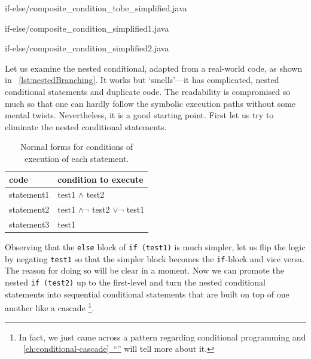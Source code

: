 \documentclass[oneside,11pt]{book}
\theoremstyle{definition}
\theoremstyle{remark}
\newcommand{\code}[1]{\mbox{\lstinline{#1}}}
\newcommand*{\fullref}[1]{\hyperref[{#1}]{\mbox{\autoref*{#1}~}``\nameref*{#1}''}}
\begin{document}
\begin{clisting}
    \begin{minipage}[t]{.3\textwidth}
        
        {if-else/composite_condition_tobe_simplified.java}
    \end{minipage}\hfill
    \begin{minipage}[t]{.3\textwidth}
        
        {if-else/composite_condition_simplified1.java}
    \end{minipage}\hfill
    \begin{minipage}[t]{.3\textwidth}
        
        {if-else/composite_condition_simplified2.java}
    \end{minipage}
\end{clisting}
Let us examine the nested conditional, adapted from a real-world code, as shown in
~\autoref{lst:nestedBranching}.
It works but `smells'---it has complicated, nested conditional statements and duplicate
code\cite{Fowler1999}.
The readability is compromised so much so that one can hardly follow the symbolic execution paths
without some mental twists.
Nevertheless, it is a good starting point.
First let us try to eliminate the nested conditional statements.


\begin{table}[bth]
    \begin{center}
        \caption{Normal forms for conditions of execution of each statement.
        \label{tbl:breakdown-of-conditions}}
        \begin{tabular}{|l|l|}
            \hline
            code & condition to execute \\
            \hline
            statement1 & test1 $\land$ test2 \\
            statement2 & test1 $\land\lnot$ test2 $\lor\lnot$ test1 \\
            statement3 & test1 \\
            \hline
        \end{tabular}
    \end{center}
\end{table}
Observing that the \code{else} block of \code{if (test1)} is much simpler, let us flip
the logic by negating \code{test1} so that the simpler block becomes the \code{if}-block and vice
versa.
The reason for doing so will be clear in a moment.
Now we can promote the nested \code{if (test2)} up to the first-level and turn the
nested conditional statements into sequential conditional statements
that are built on top of one another like a cascade \footnote{In fact,
we just came across a pattern regarding conditional programming and
~\fullref{ch:conditional-cascade} will tell more about it.}.
\end{document}
